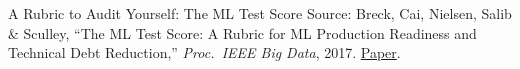 \begin{frame}{A Rubric to Audit Yourself: The ML Test Score}
    \vspace{0.12em}
    {\scriptsize Source: Breck, Cai, Nielsen, Salib \& Sculley, ``The ML Test Score: A Rubric for ML Production
    Readiness and Technical Debt Reduction,'' \textit{Proc.\ IEEE Big Data}, 2017.
    \href{https://research.google/pubs/the-ml-test-score-a-rubric-for-ml-production-readiness-and-technical-debt-reduction/}{Paper}.}

\end{frame}
